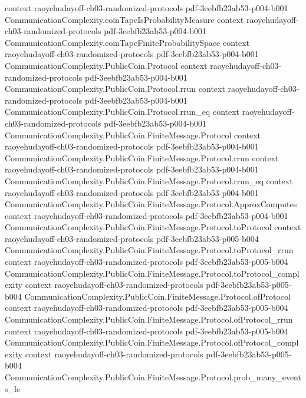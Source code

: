 \begin{theorem}
  {context}
  {raoyehudayoff-ch03-randomized-protocols}
  {pdf-3eebfb23ab53-p004-b001}
\proofstep
  {CommunicationComplexity.coinTapeIsProbabilityMeasure}
  {context}
  {raoyehudayoff-ch03-randomized-protocols}
  {pdf-3eebfb23ab53-p004-b001}
\proofstep
  {CommunicationComplexity.coinTapeFiniteProbabilitySpace}
  {context}
  {raoyehudayoff-ch03-randomized-protocols}
  {pdf-3eebfb23ab53-p004-b001}
\proofstep
  {CommunicationComplexity.PublicCoin.Protocol}
  {context}
  {raoyehudayoff-ch03-randomized-protocols}
  {pdf-3eebfb23ab53-p004-b001}
\proofstep
  {CommunicationComplexity.PublicCoin.Protocol.rrun}
  {context}
  {raoyehudayoff-ch03-randomized-protocols}
  {pdf-3eebfb23ab53-p004-b001}
\proofstep
  {CommunicationComplexity.PublicCoin.Protocol.rrun_eq}
  {context}
  {raoyehudayoff-ch03-randomized-protocols}
  {pdf-3eebfb23ab53-p004-b001}
\proofstep
  {CommunicationComplexity.PublicCoin.FiniteMessage.Protocol}
  {context}
  {raoyehudayoff-ch03-randomized-protocols}
  {pdf-3eebfb23ab53-p004-b001}
\proofstep
  {CommunicationComplexity.PublicCoin.FiniteMessage.Protocol.rrun}
  {context}
  {raoyehudayoff-ch03-randomized-protocols}
  {pdf-3eebfb23ab53-p004-b001}
\proofstep
  {CommunicationComplexity.PublicCoin.FiniteMessage.Protocol.rrun_eq}
  {context}
  {raoyehudayoff-ch03-randomized-protocols}
  {pdf-3eebfb23ab53-p004-b001}
\proofstep
  {CommunicationComplexity.PublicCoin.FiniteMessage.Protocol.ApproxComputes}
  {context}
  {raoyehudayoff-ch03-randomized-protocols}
  {pdf-3eebfb23ab53-p004-b001}
\proofstep
  {CommunicationComplexity.PublicCoin.FiniteMessage.Protocol.toProtocol}
  {context}
  {raoyehudayoff-ch03-randomized-protocols}
  {pdf-3eebfb23ab53-p005-b004}
\proofstep
  {CommunicationComplexity.PublicCoin.FiniteMessage.Protocol.toProtocol_rrun}
  {context}
  {raoyehudayoff-ch03-randomized-protocols}
  {pdf-3eebfb23ab53-p005-b004}
\proofstep
  {CommunicationComplexity.PublicCoin.FiniteMessage.Protocol.toProtocol_complexity}
  {context}
  {raoyehudayoff-ch03-randomized-protocols}
  {pdf-3eebfb23ab53-p005-b004}
\proofstep
  {CommunicationComplexity.PublicCoin.FiniteMessage.Protocol.ofProtocol}
  {context}
  {raoyehudayoff-ch03-randomized-protocols}
  {pdf-3eebfb23ab53-p005-b004}
\proofstep
  {CommunicationComplexity.PublicCoin.FiniteMessage.Protocol.ofProtocol_rrun}
  {context}
  {raoyehudayoff-ch03-randomized-protocols}
  {pdf-3eebfb23ab53-p005-b004}
\proofstep
  {CommunicationComplexity.PublicCoin.FiniteMessage.Protocol.ofProtocol_complexity}
  {context}
  {raoyehudayoff-ch03-randomized-protocols}
  {pdf-3eebfb23ab53-p005-b004}
\proofstep
  {CommunicationComplexity.PublicCoin.FiniteMessage.Protocol.prob_many_events_le}

\end{theorem}
